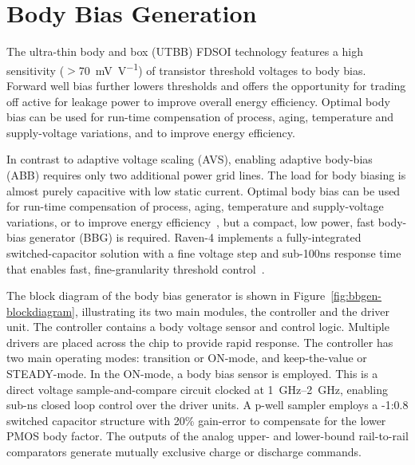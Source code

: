 \documentclass[graybox]{svmult}
\begin{document}
\section{Body Bias Generation}

The ultra-thin body and box (UTBB) FDSOI technology features a high sensitivity ($>$\SI{70}{\milli\volt\per\volt}) of transistor threshold voltages to body bias.
Forward well bias further lowers thresholds and offers the opportunity for trading off active for leakage power to improve overall energy efficiency.
Optimal body bias can be used for run-time compensation of process, aging, temperature and supply-voltage variations, and to improve energy efficiency.

In contrast to adaptive voltage scaling (AVS), enabling adaptive body-bias (ABB) requires only two additional power grid lines.
The load for body biasing is almost purely capacitive with low static current.
Optimal body bias can be used for run-time compensation of process, aging, temperature and supply-voltage variations, or to improve energy efficiency~\cite{Tschanz2002}, but a compact, low power, fast body-bias generator (BBG) is required.
Raven-4 implements a fully-integrated switched-capacitor solution with a fine voltage step and sub-100ns response time that enables fast, fine-granularity threshold control~\cite{Blagojevic2016}.

The block diagram of the body bias generator is shown in Figure~\ref{fig:bbgen-blockdiagram}, illustrating its two main modules, the controller and the driver unit.
The controller contains a body voltage sensor and control logic.
Multiple drivers are placed across the chip to provide rapid response.
The controller has two main operating modes: transition or ON-mode, and keep-the-value or STEADY-mode.
In the ON-mode, a body bias sensor is employed.
This is a direct voltage sample-and-compare circuit clocked at \SIrange[range-phrase = --]{1}{2}{\giga\hertz}, enabling sub-ns closed loop control over the driver units.
A p-well sampler employs a -1:0.8 switched capacitor structure with 20\% gain-error to compensate for the lower PMOS body factor.
The outputs of the analog upper- and lower-bound rail-to-rail comparators generate mutually exclusive charge or discharge commands.
\end{document}
